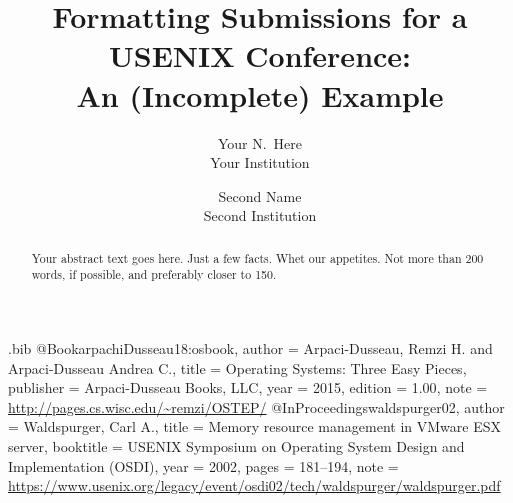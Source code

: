 \usepackage{filecontents}

\begin{filecontents}{\jobname.bib}
@Book{arpachiDusseau18:osbook,
  author =       {Arpaci-Dusseau, Remzi H. and Arpaci-Dusseau Andrea C.},
  title =        {Operating Systems: Three Easy Pieces},
  publisher =    {Arpaci-Dusseau Books, LLC},
  year =         2015,
  edition =      {1.00},
  note =         {\url{http://pages.cs.wisc.edu/~remzi/OSTEP/}}
}
@InProceedings{waldspurger02,
  author =       {Waldspurger, Carl A.},
  title =        {Memory resource management in {VMware ESX} server},
  booktitle =    {USENIX Symposium on Operating System Design and
                  Implementation (OSDI)},
  year =         2002,
  pages =        {181--194},
  note =         {\url{https://www.usenix.org/legacy/event/osdi02/tech/waldspurger/waldspurger.pdf}}}
\end{filecontents}



\date{}

\title{\Large \bf Formatting Submissions for a USENIX Conference:\\
  An (Incomplete) Example}

\author{
{\rm Your N.\ Here}\\
Your Institution
\and
{\rm Second Name}\\
Second Institution
} %

\maketitle

\begin{abstract}
Your abstract text goes here. Just a few facts. Whet our appetites.
Not more than 200 words, if possible, and preferably closer to 150.
\end{abstract}


